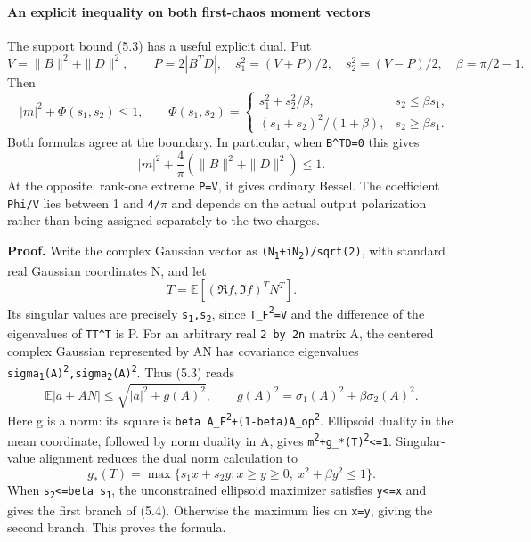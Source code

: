\paragraph{An explicit inequality on both first-chaos moment
vectors}\label{an-explicit-inequality-on-both-first-chaos-moment-vectors}

The support bound (5.3) has a useful explicit dual. Put \[
 V=\|B\|^2+\|D\|^2,\qquad P=2|B^TD|,
 \quad s_1^2=(V+P)/2,\quad s_2^2=(V-P)/2,
 \quad \beta=\pi/2-1.
\] Then \[
 \boxed{\quad |m|^2+\Phi(s_1,s_2)\le1,\qquad
 \Phi(s_1,s_2)=
 \begin{cases}
  s_1^2+s_2^2/\beta,&s_2\le\beta s_1,\\
  (s_1+s_2)^2/(1+\beta),&s_2\ge\beta s_1.
 \end{cases}\quad}
\tag{5.4}
\] Both formulas agree at the boundary. In particular, when
\texttt{B\^{}TD=0} this gives \[
 |m|^2+\frac4\pi(\|B\|^2+\|D\|^2)\le1.
\tag{5.5}
\] At the opposite, rank-one extreme \texttt{P=V}, it gives ordinary
Bessel. The coefficient \texttt{Phi/V} lies between 1 and \texttt{4/\ensuremath{\pi}}
and depends on the actual output polarization rather than being assigned
separately to the two charges.

\textbf{Proof.} Write the complex Gaussian vector as
\texttt{(N\textsubscript{1}+iN\textsubscript{2})/sqrt(2)}, with standard real Gaussian coordinates N,
and let \[
 T=\mathbb E[(\Re f,\Im f)^TN^T].
\] Its singular values are precisely \texttt{s\textsubscript{1},s\textsubscript{2}}, since
\texttt{\textbar{}\textbar{}T\textbar{}\textbar{}\_F\textsuperscript{2}=V} and the
difference of the eigenvalues of \texttt{TT\^{}T} is P. For an arbitrary
real \texttt{2\ by\ 2n} matrix A, the centered complex Gaussian
represented by AN has covariance eigenvalues
\texttt{sigma\textsubscript{1}(A)\textsuperscript{2},sigma\textsubscript{2}(A)\textsuperscript{2}}. Thus (5.3) reads \[
 \mathbb E|a+AN|\le
 \sqrt{|a|^2+g(A)^2},\qquad
 g(A)^2=\sigma_1(A)^2+\beta\sigma_2(A)^2.
\] Here g is a norm: its square is
\texttt{beta\ \textbar{}\textbar{}A\textbar{}\textbar{}\_F\textsuperscript{2}+(1-beta)\textbar{}\textbar{}A\textbar{}\textbar{}\_op\textsuperscript{2}}.
Ellipsoid duality in the mean coordinate, followed by norm duality in A,
gives \texttt{\textbar{}m\textbar{}\textsuperscript{2}+g\_*(T)\textsuperscript{2}\textless{}=1}.
Singular-value alignment reduces the dual norm calculation to \[
 g_*(T)=\max\{s_1x+s_2y:x\ge y\ge0,\ x^2+\beta y^2\le1\}.
\] When \texttt{s\textsubscript{2}\textless{}=beta\ s\textsubscript{1}}, the unconstrained ellipsoid
maximizer satisfies \texttt{y\textless{}=x} and gives the first branch
of (5.4). Otherwise the maximum lies on \texttt{x=y}, giving the second
branch. This proves the formula.

